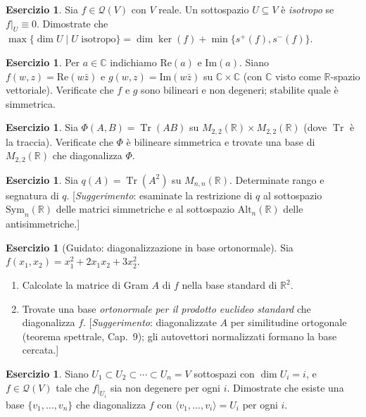 \documentclass[11pt, a4paper]{book}
\theoremstyle{definition}
\newtheorem{esercizio}[definizione]{Esercizio}
\theoremstyle{plain}
\theoremstyle{remark}
\newcommand{\R}{\mathbb{R}}
\newcommand{\C}{\mathbb{C}}
\DeclareMathOperator{\Tr}{Tr}
\begin{document}
\begin{esercizio}
Sia $f \in \mathcal{Q}(V)$ con $V$ reale. Un sottospazio $U \subseteq V$ è \emph{isotropo} se $f|_U \equiv 0$. Dimostrate che $\max\{\dim U \mid U \text{ isotropo}\} = \dim\ker(f) + \min\{s^+(f),s^-(f)\}$.
\end{esercizio}

\begin{esercizio}
Per $a\in\C$ indichiamo $\mathrm{Re}(a)$ e $\mathrm{Im}(a)$. Siano $f(w,z) = \mathrm{Re}(w\bar{z})$ e $g(w,z) = \mathrm{Im}(w\bar{z})$ su $\C\times\C$ (con $\C$ visto come $\R$-spazio vettoriale). Verificate che $f$ e $g$ sono bilineari e non degeneri; stabilite quale è simmetrica.
\end{esercizio}

\begin{esercizio}
Sia $\Phi(A,B) = \Tr(AB)$ su $M_{2,2}(\R)\times M_{2,2}(\R)$ (dove $\Tr$ è la traccia). Verificate che $\Phi$ è bilineare simmetrica e trovate una base di $M_{2,2}(\R)$ che diagonalizza $\Phi$.
\end{esercizio}

\begin{esercizio}
Sia $q(A) = \Tr(A^2)$ su $M_{n,n}(\R)$. Determinate rango e segnatura di $q$. [\emph{Suggerimento}: esaminate la restrizione di $q$ al sottospazio $\mathrm{Sym}_n(\R)$ delle matrici simmetriche e al sottospazio $\mathrm{Alt}_n(\R)$ delle antisimmetriche.]
\end{esercizio}

\begin{esercizio}[Guidato: diagonalizzazione in base ortonormale]
Sia $f(x_1,x_2) = x_1^2+2x_1x_2+3x_2^2$.
\begin{enumerate}[label=(\arabic*)]
  \item Calcolate la matrice di Gram $A$ di $f$ nella base standard di $\R^2$.
  \item Trovate una base \emph{ortonormale per il prodotto euclideo standard} che diagonalizza $f$. [\emph{Suggerimento}: diagonalizzate $A$ per similitudine ortogonale (teorema spettrale, Cap.~9); gli autovettori normalizzati formano la base cercata.]
\end{enumerate}
\end{esercizio}

\begin{esercizio}
\label{es:base-diag-catena}
Siano $U_1 \subset U_2 \subset \cdots \subset U_n = V$ sottospazi con $\dim U_i = i$, e $f \in \mathcal{Q}(V)$ tale che $f|_{U_i}$ sia non degenere per ogni $i$. Dimostrate che esiste una base $\{v_1,\ldots,v_n\}$ che diagonalizza $f$ con $\langle v_1,\ldots,v_i\rangle = U_i$ per ogni $i$.
\end{esercizio}
\end{document}
